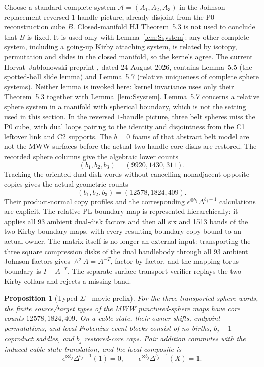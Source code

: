 \documentclass[11pt]{amsart}
\newtheorem{proposition}[theorem]{Proposition}
\theoremstyle{definition}
\theoremstyle{remark}
\begin{document}
Choose a standard complete system
\(\mathcal A=(A_1,A_2,A_3)\) in the Johnson replacement reversed
$1$-handle picture, already disjoint from the P0 reconstruction cube $B$.
Closed-manifold HJ Theorem~5.3 is not used to conclude that $B$ is fixed.
It is used only with Lemma~\ref{lem:Ssystem}: any other complete system,
including a going-up Kirby attaching system, is related by isotopy,
permutation and slides in the closed manifold, so the kernels agree.
The current Horvat--Jab\l{}onowski preprint \cite{HorvatJablonowski2025},
dated 24 August 2026, contains Lemma~5.5 (the spotted-ball slide lemma) and
Lemma~5.7 (relative uniqueness of complete sphere systems).  Neither lemma
is invoked here: kernel invariance uses only their Theorem~5.3 together with
Lemma~\ref{lem:Ssystem}.  Lemma~5.7 concerns a relative sphere system in a
manifold with spherical boundary, which is not the setting used in this
section.
In the reversed $1$-handle picture, three belt spheres miss the P0 cube,
with dual loops pairing to the identity and disjointness from the C1 leftover
link and C2 supports.  The $b=0$ foams of that abstract belt model are not the
MWW surfaces before the actual two-handle core disks are restored.  The
recorded sphere columns give the algebraic lower counts
\[
(b_1,b_2,b_3)=(9920,1430,311).
\]
Tracking the oriented dual-disk words without cancelling nonadjacent opposite
copies gives the actual geometric counts
\[
(b_1,b_2,b_3)=(12578,1824,409).
\]
Their product-normal copy profiles and the corresponding
$\epsilon^{\otimes b_j}\Delta^{b_j-1}$ calculations are explicit.  The
relative PL boundary map is represented hierarchically: it applies all 93
ambient dual-disk factors and then all six and 1513 bands of the two Kirby
boundary maps, with every resulting boundary copy bound to an actual owner.
The matrix itself is no longer an external input: transporting the three
square compression disks of the dual handlebody through all 93 ambient
Johnson factors gives $\wedge^2A=A^{-T}$, factor by factor, and the
mapping-torus boundary is $I-A^{-T}$.  The separate surface-transport
verifier replays the two Kirby collars and rejects a missing band.

\begin{proposition}[Typed $\Sigma_-$ movie prefix]
\label{prop:sigma-minus-typed}
For the three transported sphere words, the finite source/target types of the
MWW punctured-sphere maps have core counts $12578,1824,409$.  On a cable
state, their owner shifts, endpoint permutations, and local Frobenius event
blocks consist of no births, $b_j-1$ coproduct saddles, and $b_j$ restored-core
caps.  Pair addition commutes with the induced cable-state translation, and
the local composite is
\[
\epsilon^{\otimes b_j}\Delta^{b_j-1}(1)=0,\qquad
\epsilon^{\otimes b_j}\Delta^{b_j-1}(X)=1.
\]
\end{proposition}
\end{document}

